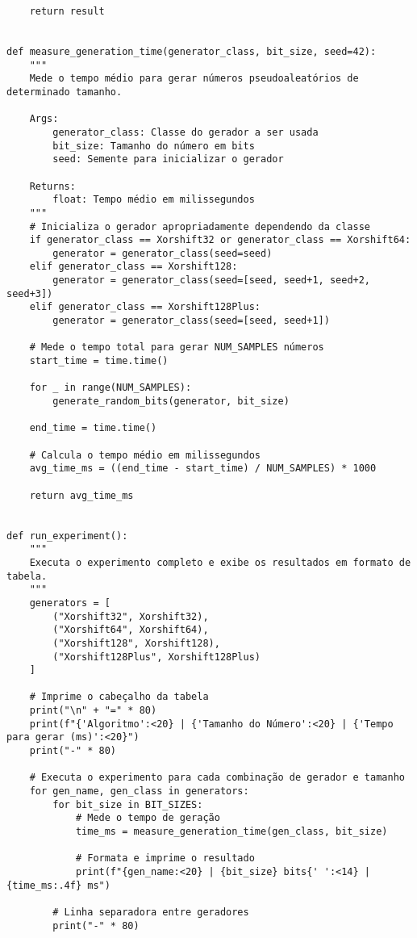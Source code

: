 \begin{verbatim}
    return result


def measure_generation_time(generator_class, bit_size, seed=42):
    """
    Mede o tempo médio para gerar números pseudoaleatórios de determinado tamanho.
    
    Args:
        generator_class: Classe do gerador a ser usada
        bit_size: Tamanho do número em bits
        seed: Semente para inicializar o gerador
    
    Returns:
        float: Tempo médio em milissegundos
    """
    # Inicializa o gerador apropriadamente dependendo da classe
    if generator_class == Xorshift32 or generator_class == Xorshift64:
        generator = generator_class(seed=seed)
    elif generator_class == Xorshift128:
        generator = generator_class(seed=[seed, seed+1, seed+2, seed+3])
    elif generator_class == Xorshift128Plus:
        generator = generator_class(seed=[seed, seed+1])
    
    # Mede o tempo total para gerar NUM_SAMPLES números
    start_time = time.time()
    
    for _ in range(NUM_SAMPLES):
        generate_random_bits(generator, bit_size)
    
    end_time = time.time()
    
    # Calcula o tempo médio em milissegundos
    avg_time_ms = ((end_time - start_time) / NUM_SAMPLES) * 1000
    
    return avg_time_ms


def run_experiment():
    """
    Executa o experimento completo e exibe os resultados em formato de tabela.
    """
    generators = [
        ("Xorshift32", Xorshift32),
        ("Xorshift64", Xorshift64),
        ("Xorshift128", Xorshift128),
        ("Xorshift128Plus", Xorshift128Plus)
    ]
    
    # Imprime o cabeçalho da tabela
    print("\n" + "=" * 80)
    print(f"{'Algoritmo':<20} | {'Tamanho do Número':<20} | {'Tempo para gerar (ms)':<20}")
    print("-" * 80)
    
    # Executa o experimento para cada combinação de gerador e tamanho
    for gen_name, gen_class in generators:
        for bit_size in BIT_SIZES:
            # Mede o tempo de geração
            time_ms = measure_generation_time(gen_class, bit_size)
            
            # Formata e imprime o resultado
            print(f"{gen_name:<20} | {bit_size} bits{' ':<14} | {time_ms:.4f} ms")
        
        # Linha separadora entre geradores
        print("-" * 80)
    

\end{verbatim}
